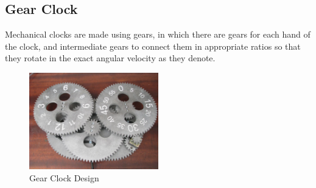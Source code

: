 \documentclass[10pt]{article} \usepackage[a4paper,left=0.8in,right=0.8in,top=0.4in,bottom=0.8in]{geometry} \usepackage{graphicx}
\begin{document}
\subsection{Gear Clock}
Mechanical clocks are made using gears\cite{wikiclkwrk}, in which there are gears for each hand of the clock, and intermediate gears to connect them in appropriate ratios so that they rotate in the exact angular velocity as they denote.

\begin{figure}[ht!]
\centering
\includegraphics[width=0.5\textwidth]{images/gear_clock.jpg}
\caption{Gear Clock Design}
\end{figure}
\end{document}
